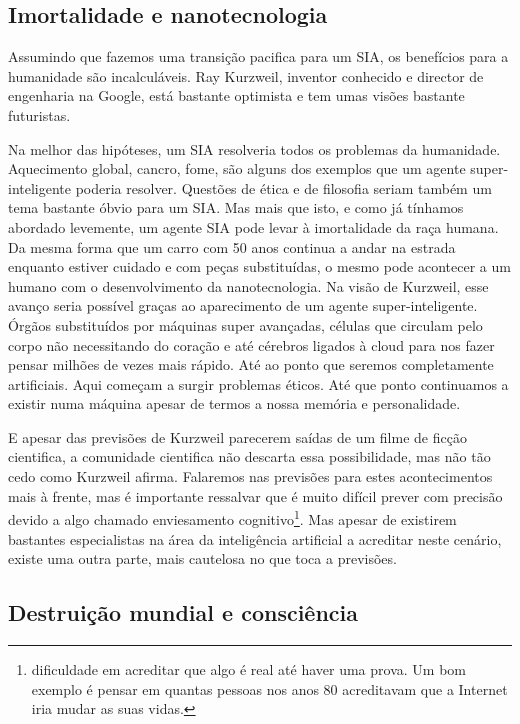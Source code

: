 \documentclass[runningheads,a4paper]{llncs}
\begin{document}
\subsection{Imortalidade e nanotecnologia}

Assumindo que fazemos uma transição pacifica para um SIA, os benefícios para a humanidade são incalculáveis. Ray Kurzweil, inventor conhecido e director de engenharia na Google, está bastante optimista e tem umas visões bastante futuristas.

Na melhor das hipóteses, um SIA resolveria todos os problemas da humanidade. Aquecimento global, cancro, fome, são alguns dos exemplos que um agente super-inteligente poderia resolver. Questões de ética e de filosofia seriam também um tema bastante óbvio para um SIA\@.
Mas mais que isto, e como já tínhamos abordado levemente, um agente SIA pode levar à imortalidade da raça humana. Da mesma forma que um carro com 50 anos continua a andar na estrada enquanto estiver cuidado e com peças substituídas, o mesmo pode acontecer a um humano com o desenvolvimento da nanotecnologia. Na visão de Kurzweil, esse avanço seria possível graças ao aparecimento de um agente super-inteligente. Órgãos substituídos por máquinas super avançadas, células que circulam pelo corpo não necessitando do coração e até cérebros ligados à cloud para nos fazer pensar milhões de vezes mais rápido. Até ao ponto que seremos completamente artificiais. Aqui começam a surgir problemas éticos. Até que ponto continuamos a existir numa máquina apesar de termos a nossa memória e personalidade.

E apesar das previsões de Kurzweil parecerem saídas de um filme de ficção cientifica, a comunidade cientifica não descarta essa possibilidade, mas não tão cedo como Kurzweil afirma. Falaremos nas previsões para estes acontecimentos mais à frente, mas é importante ressalvar que é muito difícil prever com precisão devido a algo chamado enviesamento cognitivo\footnote{dificuldade em acreditar que algo é real até haver uma prova. Um bom exemplo é pensar em quantas pessoas nos anos 80 acreditavam que a Internet iria mudar as suas vidas.}. Mas apesar de existirem bastantes especialistas na área da inteligência artificial a acreditar neste cenário, existe uma outra parte, mais cautelosa no que toca a previsões.

\subsection{Destruição mundial e consciência}
\end{document}
